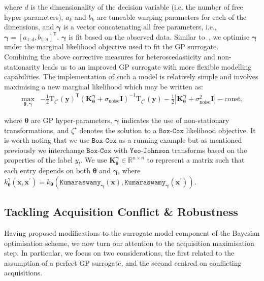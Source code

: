 \documentclass[jair,twoside,11pt,theapa]{article}
\let\cite\shortcite
\theoremstyle{definition}
\begin{document}
where $d$ is the dimensionality of the decision variable (i.e. the number of free hyper-parameters), $a_{k}$ and $b_{k}$ are tuneable warping parameters for each of the dimensions, and $\bm{\gamma}$ is a vector concatenating all free parameters, i.e., $\bm{\gamma}= [a_{1:d}, b_{1:d}]^{\mathsf{T}}$. $\bm{\gamma}$ is fit based on the observed data. Similar to~\cite{balandat2020botorch}, we optimise $\bm{\gamma}$ under the marginal likelihood objective used to fit the GP surrogate. \\

 Combining the above corrective measures for heteroscedasticity and non-stationarity leads us to an improved GP surrogate with more flexible modelling capabilities. The implementation of such a model is relatively simple and involves maximising a new marginal likelihood which may be written as:
\begin{align*}
    \max_{\bm{\theta}, \bm{\gamma}} &- \frac{1}{2} \text{T}_{\zeta^{\star}}(\bm{y})^{\mathsf{T}}(\bm{K}^{\bm{\gamma}}_{\bm{\theta}} + \sigma_{\text{noise}}\bm{I})^{-1}\text{T}_{\zeta^{\star}}(\bm{y}) - \frac{1}{2}|\bm{K}^{\bm{\gamma}}_{\bm{\theta}} + \sigma_{\text{noise}}^{2} \bm{I}| - \text{const,}
\end{align*}

\noindent where $\bm{\theta}$ are GP hyper-parameters, $\bm{\gamma}$ indicates the use of non-stationary transformations, and $\zeta^{\star}$ denotes the solution to a $\texttt{Box-Cox}$ likelihood objective. It is worth noting that we use $\texttt{Box-Cox}$ as a running example but as mentioned previously we interchange $\texttt{Box-Cox}$ with $\texttt{Yeo-Johnson}$ transforms based on the properties of the label $y_l$. We use $\bm{K}^{\bm{\gamma}}_{\bm{\theta}} \in \mathbb{R}^{n \times n}$ to represent a matrix such that each entry depends on both $\bm{\theta}$ and $\bm{\gamma}$, where $k_{\bm{\theta}}^{\gamma} (\bm{x}, \bm{x}^{\prime}) = k_{\bm{\theta}}(\texttt{Kumaraswamy}_{\bm{\gamma}} (\bm{x}), \texttt{Kumaraswamy}_{\bm{\gamma}} (\bm{x}^{\prime}))$.  

\subsection{Tackling Acquisition Conflict \& Robustness}
Having proposed modifications to the surrogate model component of the Bayesian optimisation scheme, we now turn our attention to the acquisition maximisation step. In particular, we focus on two considerations, the first related to the assumption of a perfect GP surrogate, and the second centred on conflicting acquisitions. 
\end{document}
